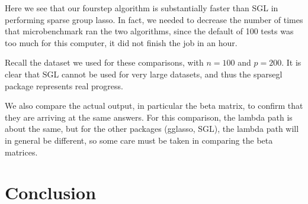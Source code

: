 \documentclass[12pt]{article}
\begin{document}
Here we see that our fourstep algorithm is substantially faster than SGL in performing sparse group lasso. In fact, we needed to decrease the number of times that microbenchmark ran the two algorithms, since the default of 100 tests was too much for this computer, it did not finish the job in an hour.

Recall the dataset we used for these comparisons, with $n=100$ and $p=200$. It is clear that SGL cannot be used for very large datasets, and thus the sparsegl package represents real progress.


We also compare the actual output, in particular the beta matrix, to confirm that they are arriving at the same answers. For this comparison, the lambda path is about the same, but for the other packages (gglasso, SGL), the lambda path will in general be different, so some care must be taken in comparing the beta matrices.

\section{Conclusion}






\end{document}
